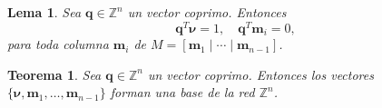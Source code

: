 \documentclass[aspectratio=169]{beamer}
\newtheorem{stheorem}{Teorema}
\newtheorem{slemma}[theorem]{Lema}
\theoremstyle{definition}
\newtheorem{sdefinition}[theorem]{Definición}
\newcommand{\Z}{\mathbb{Z}}
\newcommand{\R}{\mathbb{R}}
\renewcommand{\vec}[1]{\boldsymbol{#1}}
\newcommand{\braces}[1]{\lbrace #1 \rbrace}
\newcommand{\paren}[1]{\left( #1 \right)}
\begin{document}
\begin{frame}
	\begin{slemma}
		Sea $\vec{q} \in \Z^{n}$ un vector coprimo. Entonces
		\begin{equation*}
			\vec{q}^T\vec{\nu} = 1, \quad \vec{q}^T\vec{m}_i = 0,
		\end{equation*}
		para toda columna $\vec{m}_i$ de $M = [\vec{m}_1 \mid \cdots \mid \vec{m}_{n-1}]$.
	\end{slemma}
	\begin{stheorem}
		Sea $\vec{q} \in \Z^{n}$ un vector coprimo. Entonces los vectores $\braces{\vec{\nu},
		\vec{m}_1, \ldots, \vec{m}_{n-1}}$ forman una base de la red $\Z^n$.
	\end{stheorem}
\end{frame}


% 
\end{document}
